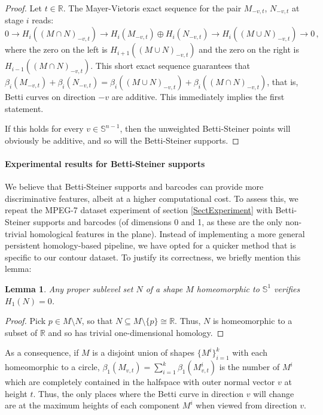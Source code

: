 \documentclass[a4paper]{article}
\newtheorem{lemma}[theorem]{Lemma}
\newcommand{\bb}{\mathbb}
\begin{document}
\begin{proof}
	Let $t \in \bb R$. The Mayer-Vietoris exact sequence for the pair $M_{-v,t}$, $N_{-v,t}$ at stage $i$ reads:
	\[ 0 \to H_i((M \cap N)_{-v,t}) \to H_i(M_{-v,t}) \oplus H_i(N_{-v,t}) \to H_i((M \cup N)_{-v,t}) \to 0\, ,\]
	where the zero on the left is $H_{i+1}((M\cup N)_{-v,t})$ and the zero on the right is $H_{i-1}((M \cap N)_{-v,t})$. This short exact sequence guarantees that $\beta_i(M_{-v,t})+\beta_i(N_{-v,t})=\beta_i((M \cup N)_{-v,t})+\beta_i((M \cap N)_{-v,t})$, that is, Betti curves on direction $-v$ are additive. This immediately implies the first statement.
	
	If this holds for every $v \in \bb S^{n-1}$, then the unweighted Betti-Steiner points will obviously be additive, and so will the Betti-Steiner supports.
\end{proof}

\paragraph{Experimental results for Betti-Steiner supports}

We believe that Betti-Steiner supports and barcodes can provide more discriminative features, albeit at a higher computational cost. To assess this, we repeat the MPEG-7 dataset experiment of section \ref{SectExperiment} with Betti-Steiner supports and barcodes (of dimensions 0 and 1, as these are the only non-trivial homological features in the plane). Instead of implementing a more general persistent homology-based pipeline, we have opted for a quicker method that is specific to our contour dataset. To justify its correctness, we briefly mention this lemma:

\begin{lemma}
	\label{LemmaSubOfCircle}
	Any proper sublevel set $N$ of a shape $M$ homeomorphic to $\bb S^1$ verifies $H_1(N) = 0$.
\end{lemma}

\begin{proof}
	Pick $p\in M \setminus N$, so that $N \subseteq M \setminus \{p\} \cong \bb R$. Thus, $N$ is homeomorphic to a subset of $\bb R$ and so has trivial one-dimensional homology.
\end{proof}

As a consequence, if $M$ is a disjoint union of shapes $\{M^i\}_{i =1}^k$ with each homeomorphic to a circle, $\beta_1(M_{v,t})= \sum_{i=1}^k\beta_1(M^i_{v,t})$ is the number of $M^i$ which are completely contained in the halfspace with outer normal vector $v$ at height $t$. Thus, the only places where the Betti curve in direction $v$ will change are at the maximum heights of each component $M^i$ when viewed from direction $v$.
\end{document}
